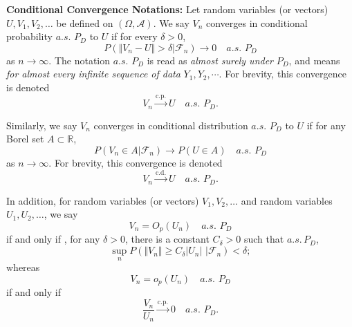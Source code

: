 \documentclass[ejs,authoryear,linksfromyear]{imsart}
\newcommand{\CONV}[1]{\stackrel{\text{#1}}{\longrightarrow}} %
\numberwithin{equation}{section}
\theoremstyle{plain}
\begin{document}
\noindent
\textbf{Conditional Convergence Notations:} Let random variables (or vectors) $U, V_1, V_2, \ldots $ be defined on $(\Omega, \mathcal{A})$. We say $V_n$ converges in conditional probability $a.s.$ $P_D$ to $U$ if for every $\delta > 0$,
$$
P( \Vert V_n - U \Vert > \delta | \mathcal{F}_n ) \to 0 \quad a.s. \,\, P_D
$$
as $n \to \infty$. The notation $a.s.$ $P_D$ is read as \textit{almost surely under} $P_D$, and means \textit{for almost every infinite sequence of data} $Y_1, Y_2, \cdots$. For brevity, this convergence is denoted
$$
V_n \CONV{c.p.} U \quad a.s. \,\, P_D.
$$ 

Similarly, we say $V_n$ converges in conditional distribution $a.s.$ $P_D$ to $U$ if for any Borel set $A \subset \mathbb{R}$, 
$$
P( V_n \in A | \mathcal{F}_n ) \to P(U \in A)  \quad a.s. \,\, P_D 
$$     
as $n \to \infty$. For brevity, this convergence is denoted
$$
V_n \CONV{c.d.} U \quad a.s. \,\, P_D.
$$ 

In addition, for random variables (or vectors) $V_1, V_2, \ldots $ and random variables $U_1, U_2, \ldots $, we say 
$$
V_n = O_p(U_n) \quad a.s. \,\, P_D
$$
if and only if , for any $\delta > 0$, there is a constant $C_\delta > 0$ such that $a.s. \, P_D$,
$$
\sup_n P \left(
	\Vert V_n \Vert \geq C_\delta |U_n| \,\, \Big| \mathcal{F}_n
\right)  < \delta;
$$
whereas
$$
V_n = o_p(U_n) \quad a.s. \,\, P_D
$$
if and only if
$$
\dfrac{V_n}{U_n} \CONV{c.p.} 0 \quad a.s. \,\, P_D.
$$
\end{document}
